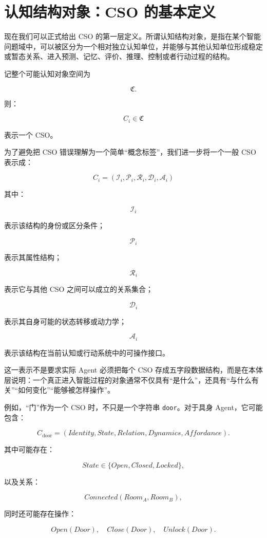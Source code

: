 \section{认知结构对象：CSO 的基本定义}

现在我们可以正式给出 CSO 的第一层定义。所谓认知结构对象，是指在某个智能问题域中，可以被区分为一个相对独立认知单位，并能够与其他认知单位形成稳定或暂态关系、进入预测、记忆、评价、推理、控制或者行动过程的结构。

记整个可能认知对象空间为

\[
\mathfrak C.
\]

则：

\[
C_i\in\mathfrak C
\]

表示一个 CSO。

为了避免把 CSO 错误理解为一个简单“概念标签”，我们进一步将一个一般 CSO 表示成：

\[
\boxed{
C_i
=
\left(
\mathcal I_i,
\mathcal P_i,
\mathcal R_i,
\mathcal D_i,
\mathcal A_i
\right)
}
\]

其中：

\[
\mathcal I_i
\]

表示该结构的身份或区分条件；

\[
\mathcal P_i
\]

表示其属性结构；

\[
\mathcal R_i
\]

表示它与其他 CSO 之间可以成立的关系集合；

\[
\mathcal D_i
\]

表示其自身可能的状态转移或动力学；

\[
\mathcal A_i
\]

表示该结构在当前认知或行动系统中的可操作接口。

这一表示不是要求实际 Agent 必须把每个 CSO 存成五字段数据结构，而是在本体层说明：一个真正进入智能过程的对象通常不仅具有“是什么”，还具有“与什么有关”“如何变化”“能够被怎样操作”。

例如，“门”作为一个 CSO 时，不只是一个字符串 \texttt{door}。对于具身 Agent，它可能包含：

\[
C_{\mathrm{door}}
=
(
Identity,
State,
Relation,
Dynamics,
Affordance
).
\]

其中可能存在：

\[
State\in
\{
Open,
Closed,
Locked
\},
\]

以及关系：

\[
Connected(Room_A,Room_B),
\]

同时还可能存在操作：

\[
Open(Door),
\quad
Close(Door),
\quad
Unlock(Door).
\]

